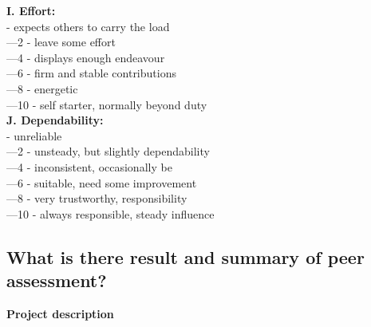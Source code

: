 \documentclass[11pt]{article}
\begin{document}
\textbf{I. Effort:}\\
	\indent{}	- expects others to carry the load\\
	\indent{}—2	- leave some effort\\
	\indent{}—4	- displays enough endeavour\\
	\indent{}—6	- firm and stable contributions\\
	\indent{}—8	- energetic\\
	\indent{}—10	- self starter, normally beyond duty\\

\textbf{J. Dependability:}\\ 
	\indent{}	- unreliable\\
	\indent{}—2	- unsteady, but slightly dependability \\
	\indent{}—4	- inconsistent, occasionally be\\
	\indent{}—6	- suitable, need some improvement \\
	\indent{}—8	- very trustworthy, responsibility \\
	\indent{}—10	- always responsible, steady influence \\
	\subsection{What is there result and summary of peer assessment?}

\newpage	




\newpage	

\appendix



\newpage	

\textbf{Project description}
\end{document}
